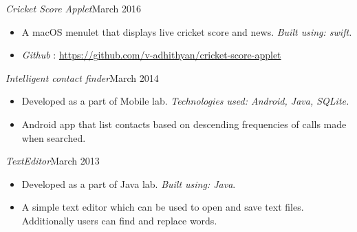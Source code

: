 \documentclass[11pt,a4paper]{article}
\begin{document}
\emph{Cricket Score Applet}{\hfill March 2016}
\begin{itemize}[noitemsep]
\item A macOS menulet that displays live cricket score and news. \emph{Built using: swift.}
\item \emph{Github} : \href{https://github.com/v-adhithyan/cricket-score-applet}{https://github.com/v-adhithyan/cricket-score-applet}
\end{itemize}
\emph{Intelligent contact finder}{\hfill March 2014}
\begin{itemize}[noitemsep]
\item Developed as a part of Mobile lab. \emph{Technologies used: Android, Java, SQLite.}
\item Android app that list contacts based on descending frequencies of calls made when searched.
\end{itemize}
\emph{TextEditor}{\hfill March 2013}
\begin{itemize}[noitemsep]
\item Developed as a part of Java lab. \emph{Built using: Java}.
\item A simple text editor which can be used to open and save text files. Additionally users can find and replace
words.
\end{itemize}
\end{document}
